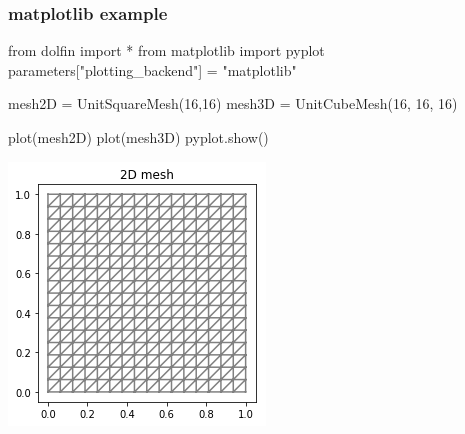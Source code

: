 \begin{frame}[fragile]
\frametitle{matplotlib example}

  \begin{python}
from dolfin import *
from matplotlib import pyplot
parameters["plotting_backend"] = "matplotlib"

mesh2D = UnitSquareMesh(16,16)
mesh3D = UnitCubeMesh(16, 16, 16)

plot(mesh2D)
plot(mesh3D)
pyplot.show()
  \end{python}
\end{frame}
\begin{frame}[fragile]
 \begin{minipage}{0.49\textwidth}
\begin{center}
    \includegraphics[width=\textwidth]{png/matplotlib_2D_mesh.png}
\end{center}
 \end{minipage}
 \begin{minipage}{0.49\textwidth}
\begin{center}

\end{center}
\end{minipage}
\end{frame}
